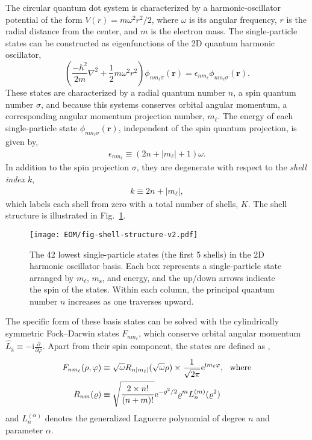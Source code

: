\documentclass[thesis.tex]{subfiles}
\begin{document}
The circular quantum dot system is characterized by a harmonic-oscillator potential of the form $V(r) = m \omega^2r^2 / 2$, where $\omega$ is its angular frequency, $r$ is the radial distance from the center, and $m$ is the electron mass.  The single-particle states can be constructed as eigenfunctions of the 2D quantum harmonic oscillator,
\begin{equation} \label{eq:2d_ho}
  \left(\frac{-\hbar^{2}}{2m}\nabla^{2} + \frac{1}{2} m\omega^{2}r^{2}\right)\phi_{n m_{\ell} \sigma}(\mathbf{r}) = \epsilon_{n m_{\ell}}\phi_{n m_{\ell} \sigma}(\mathbf{r}).
\end{equation}
These states are characterized by a radial quantum number $n$, a spin quantum number $\sigma$, and because this systems conserves orbital angular momentum, a corresponding angular momentum projection number, $m_{\ell}$.  The energy of each single-particle state $\phi_{n m_{\ell} \sigma}(\mathbf{r})$, independent of the spin quantum projection, is given by,
\begin{align} \label{eq:energysingleparticlestate}
  \epsilon_{n m_{\ell}} \equiv (2 n + |m_\ell| + 1) \omega.
\end{align}
In addition to the spin projection $\sigma$, they are degenerate with respect to the \textit{shell index} $k$,
\begin{align} \label{eq:shell_index}
  k \equiv 2 n + |m_\ell|,
\end{align}
which labels each shell from zero with a total number of shells, $K$.  The shell structure is illustrated in Fig.\ \ref{fig:qd-shell-structure}.
\begin{figure}[h]
  \centering
  \texttt{[image: EOM/fig-shell-structure-v2.pdf]}
  \caption{The 42 lowest single-particle states (the first 5 shells) in the 2D harmonic oscillator basis.  Each box represents a single-particle state arranged by $m_\ell$, $m_{\mathrm{s}}$, and energy, and the up/down arrows indicate the spin of the states.  Within each column, the principal quantum number $n$ increases as one traverses upward.}
  \label{fig:qd-shell-structure}
\end{figure}

The specific form of these basis states can be solved with the cylindrically symmetric Fock--Darwin states $F_{n m_{\ell}}$, which conserve orbital angular momentum $\hat{L}_{\mathrm{z}} \equiv -\mathrm{i} \frac{\partial}{\partial \varphi}$.  Apart from their spin component, the states are defined as \cite{lohne2010coupled},
\begin{align}
  F_{n m_{\ell}}(\rho, \varphi) &\equiv \sqrt\omega R_{n |m_\ell|}(\sqrt \omega \rho) \times \frac{1}{\sqrt{2 \pi}} \mathrm{e}^{\mathrm{i} m_\ell \varphi} \label{eq:fockdarwin},\ \ \text{where} \\
  R_{n m}(\varrho) &\equiv \sqrt{\frac{2 \times n!}{(n + m)!}} \mathrm{e}^{-\varrho^2 / 2} \varrho^m L_n^{(m)}(\varrho^2) \notag
\end{align}
and $L_n^{(\alpha)}$ denotes the generalized Laguerre polynomial \cite{NIST:DLMF} of degree $n$ and parameter $\alpha$.
\end{document}
